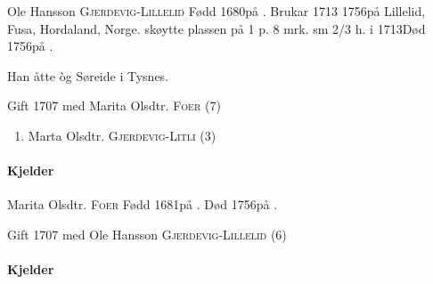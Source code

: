 \documentclass[pdftex,twocolumn,10pt,oneside]{scrartcl}
\begin{document}
Ole Hansson \textsc{Gjerdevig-Lillelid} Fødd 1680på . Brukar 1713 1756på Lillelid, Fusa, Hordaland, Norge. skøytte plassen på 1 p. 8 mrk. sm 2/3 h. i 1713Død 1756på . 

Han åtte òg Søreide i Tysnes.

Gift 1707  med Marita Olsdtr. \textsc{Foer} (\textsc{7})\begin{enumerate}
  \item Marta Olsdtr. \textsc{Gjerdevig-Litli} (\textsc{3})
\end{enumerate}


\paragraph{Kjelder}
\cite[s. 575]{@S63@}

Marita Olsdtr. \textsc{Foer} Fødd 1681på . Død 1756på . 

Gift 1707  med Ole Hansson \textsc{Gjerdevig-Lillelid} (\textsc{6})\paragraph{Kjelder}
\cite[s. 575]{@S63@}

\end{document}
